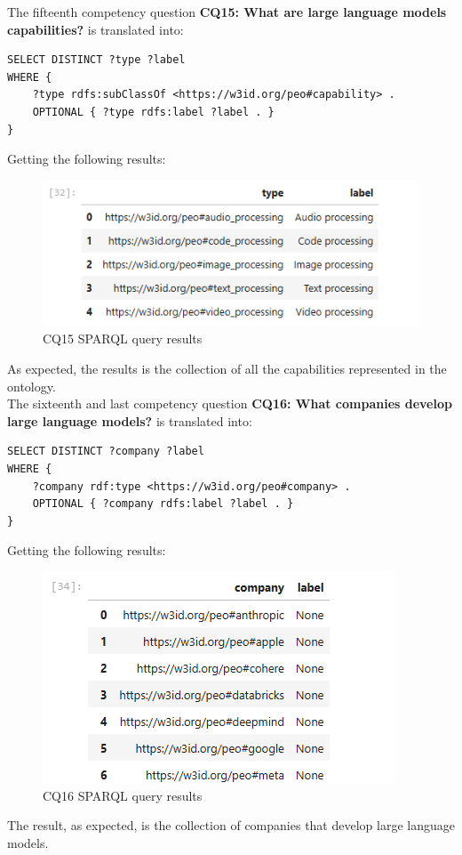 The fifteenth competency question \textbf{CQ15: What are large language models capabilities?} is translated into:
\begin{lstlisting}
SELECT DISTINCT ?type ?label
WHERE {
    ?type rdfs:subClassOf <https://w3id.org/peo#capability> .
    OPTIONAL { ?type rdfs:label ?label . }
}
\end{lstlisting}
Getting the following results:
\begin{figure}[H]
    \centering
    \includegraphics[width=0.8\linewidth]{Figures/fig_61.png}
    \caption{CQ15 SPARQL query results}
    \label{fig:enter-label}
\end{figure}
As expected, the results is the collection of all the capabilities represented in the ontology.\\

The sixteenth and last competency question \textbf{CQ16: What companies develop large language models?} is translated into:
\begin{lstlisting}
SELECT DISTINCT ?company ?label
WHERE {
    ?company rdf:type <https://w3id.org/peo#company> .
    OPTIONAL { ?company rdfs:label ?label . }
}
\end{lstlisting}
Getting the following results:
\begin{figure}[H]
    \centering
    \includegraphics[width=0.8\linewidth]{Figures/fig_62.png}
    \caption{CQ16 SPARQL query results}
    \label{fig:enter-label}
\end{figure}
The result, as expected, is the collection of companies that develop large language models.


